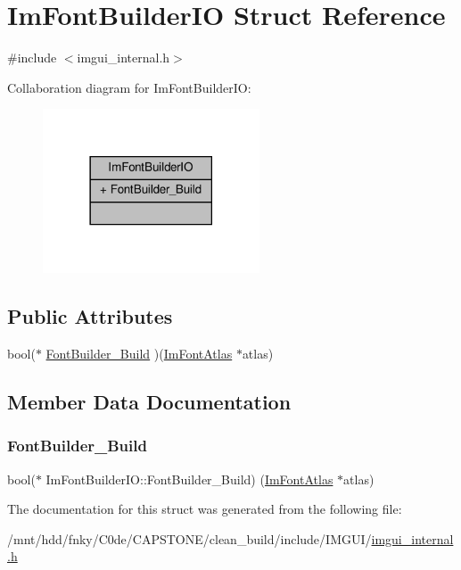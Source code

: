 \hypertarget{structImFontBuilderIO}{}\section{Im\+Font\+Builder\+IO Struct Reference}
\label{structImFontBuilderIO}


{\ttfamily \#include $<$imgui\+\_\+internal.\+h$>$}



Collaboration diagram for Im\+Font\+Builder\+IO\+:
\nopagebreak
\begin{figure}[H]
\begin{center}
\leavevmode
\includegraphics[width=182pt]{structImFontBuilderIO__coll__graph}
\end{center}
\end{figure}
\subsection*{Public Attributes}
\begin{DoxyCompactItemize}
\item 
bool($\ast$ \hyperlink{structImFontBuilderIO_a81018973af73c727705382fe8c4155b5}{Font\+Builder\+\_\+\+Build} )(\hyperlink{structImFontAtlas}{Im\+Font\+Atlas} $\ast$atlas)
\end{DoxyCompactItemize}


\subsection{Member Data Documentation}
\mbox{\label{structImFontBuilderIO_a81018973af73c727705382fe8c4155b5}} 
\subsubsection{\texorpdfstring{Font\+Builder\+\_\+\+Build}{FontBuilder\_Build}}
{\footnotesize\ttfamily bool($\ast$ Im\+Font\+Builder\+I\+O\+::\+Font\+Builder\+\_\+\+Build) (\hyperlink{structImFontAtlas}{Im\+Font\+Atlas} $\ast$atlas)}



The documentation for this struct was generated from the following file\+:\begin{DoxyCompactItemize}
\item 
/mnt/hdd/fnky/\+C0de/\+C\+A\+P\+S\+T\+O\+N\+E/clean\+\_\+build/include/\+I\+M\+G\+U\+I/\hyperlink{imgui__internal_8h}{imgui\+\_\+internal.\+h}\end{DoxyCompactItemize}
